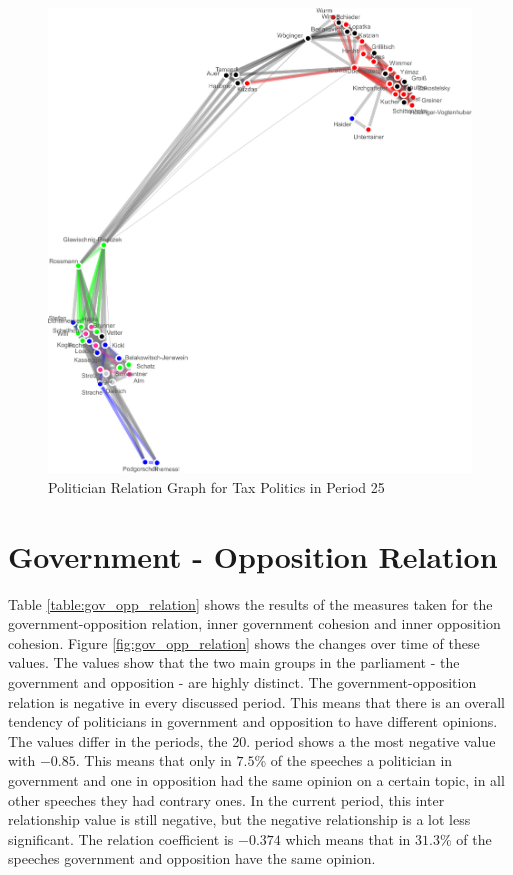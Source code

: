 \begin{figure}
\center
	\includegraphics[width=\textwidth]{imgs/graphs/graph_25_tax.eps}
	
	\caption{Politician Relation Graph for Tax Politics in Period 25}
	\label{fig:pol_graph_tax}
\end{figure}

\section{Government - Opposition Relation}
\label{sec:gov_opp_relation}
Table \ref{table:gov_opp_relation} shows the results of the measures taken for the government-opposition relation, inner government cohesion and inner opposition cohesion. Figure \ref{fig:gov_opp_relation} shows the changes over time of these values. The values show that the two main groups in the parliament - the government and opposition - are highly distinct. The government-opposition relation is negative in every discussed period. This means that there is an overall tendency of politicians in government and opposition to have different opinions. The values differ in the periods, the 20. period shows a the most negative value with $-0.85$. This means that only in $7.5$\% of the speeches a politician in government and one in opposition had the same opinion on a certain topic, in all other speeches they had contrary ones. In the current period, this inter relationship value is still negative, but the negative relationship is a lot less significant. The relation coefficient is $-0.374$ which means that in $31.3$\% of the speeches government and opposition have the same opinion.

